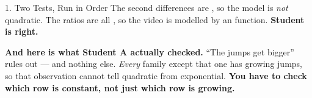 \documentclass[10pt]{article}
\begin{document}
\begin{notesbox}{1. Two Tests, Run in Order}
\vspace{6pt}
The second differences are , so the model is \emph{not} quadratic. The ratios are all
, so the video is modelled by an  function. \textbf{Student
 is right.}

\vspace{4pt}
\textbf{And here is what Student A actually checked.} ``The jumps get bigger'' rules out
 --- and nothing else. \emph{Every} family except that one has growing jumps, so that
observation cannot tell quadratic from exponential. \textbf{You have to check which row is
constant, not just which row is growing.}
\end{notesbox}

\vspace{0.10in}
\end{document}
